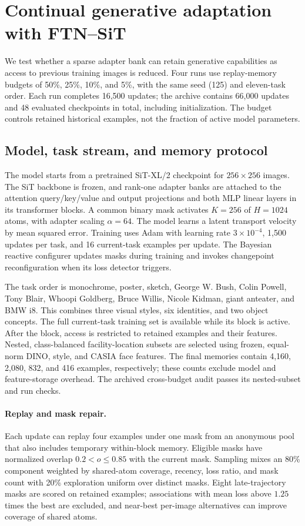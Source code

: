 \section{Continual generative adaptation with FTN--SiT}\label{sec:sit_memory}
We test whether a sparse adapter bank can retain generative capabilities as access to previous training images is reduced. Four runs use replay-memory budgets of 50\%, 25\%, 10\%, and 5\%, with the same seed (125) and eleven-task order. Each run completes 16,500 updates; the archive contains 66,000 updates and 48 evaluated checkpoints in total, including initialization. The budget controls retained historical examples, not the fraction of active model parameters.

\subsection{Model, task stream, and memory protocol}
The model starts from a pretrained SiT-XL/2 checkpoint for $256\times256$ images. The SiT backbone is frozen, and rank-one adapter banks are attached to the attention query/key/value and output projections and both MLP linear layers in its transformer blocks. A common binary mask activates $K=256$ of $H=1024$ atoms, with adapter scaling $\alpha=64$. The model learns a latent transport velocity by mean squared error. Training uses Adam with learning rate $3\times10^{-4}$, 1,500 updates per task, and 16 current-task examples per update. The Bayesian reactive configurer updates masks during training and invokes changepoint reconfiguration when its loss detector triggers.

The task order is monochrome, poster, sketch, George W. Bush, Colin Powell, Tony Blair, Whoopi Goldberg, Bruce Willis, Nicole Kidman, giant anteater, and BMW i8. This combines three visual styles, six identities, and two object concepts. The full current-task training set is available while its block is active. After the block, access is restricted to retained examples and their features. Nested, class-balanced facility-location subsets are selected using frozen, equal-norm DINO, style, and CASIA face features. The final memories contain 4,160, 2,080, 832, and 416 examples, respectively; these counts exclude model and feature-storage overhead. The archived cross-budget audit passes its nested-subset and run checks.

\paragraph{Replay and mask repair.}
Each update can replay four examples under one mask from an anonymous pool that also includes temporary within-block memory. Eligible masks have normalized overlap $0.2<o\leq0.85$ with the current mask. Sampling mixes an 80\% component weighted by shared-atom coverage, recency, loss ratio, and mask count with 20\% exploration uniform over distinct masks. Eight late-trajectory masks are scored on retained examples; associations with mean loss above $1.25$ times the best are excluded, and near-best per-image alternatives can improve coverage of shared atoms.


